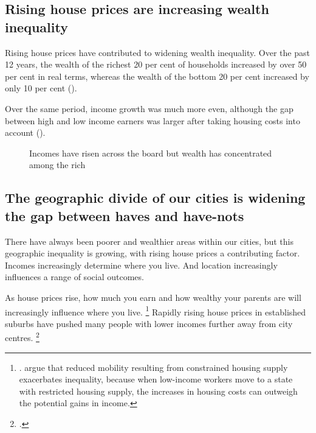\subsection{Rising house prices are increasing wealth inequality }\label{subsec:rising-house-prices-increased-wealthinequality}

Rising house prices have contributed to widening wealth inequality.
Over the past 12 years, the wealth of the richest 20 per cent of households increased by over 50 per cent in real terms, whereas the wealth of the bottom 20 per cent increased by only 10 per cent ().

Over the same period, income growth was much more even, although the gap between high and low income earners was larger after taking housing costs into account (). 

\begin{figure}
\caption{Incomes have risen across the board but wealth has concentrated among the rich}\label{fig:wealth-income-real-growth}
{\textcite{ABS-2017-HouseholdIncomeAndWealth-201516}}
\end{figure}


\subsection{The geographic divide of our cities is widening the gap between haves and have-nots}\label{subsec:higher-house-prices-are-contributing-to-a-greater-divide-between-the-have-and-have-nots-in-our-cities}

There have always been poorer and wealthier areas within our cities, but this geographic inequality is growing, with rising house prices a contributing factor.
Incomes increasingly determine where you live.
And location increasingly influences a range of social outcomes.

As house prices rise, how much you earn and how wealthy your parents are will increasingly influence where you live.%
	\footnote{\textcite[][182--183]{Rethinking-the-economics-of-land-and-housing-2017}.
	\textcite{Ganong-Shoag-2017-Why-has-regional-income-convergence-declined} argue that reduced mobility resulting from constrained housing supply exacerbates inequality, because when low-income workers move to a state with restricted housing supply, the increases in housing costs can outweigh the potential gains in income.}
Rapidly rising house prices in established suburbs have pushed many people with lower incomes further away from city centres.%
	\footcites{DIRD-2015-Sydney-factsheet-State-of-Sydney-cities}{KellyHarrisonHunterEtAl2013}

